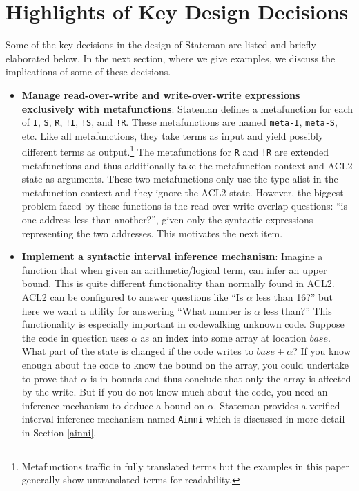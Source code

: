 \documentclass[submission,copyright,creativecommons]{eptcs}
\newcommand{\ptt}[1]{\tt{#1}}
\begin{document}
\section{Highlights of Key Design Decisions}

Some of the key decisions in the design of Stateman are listed and briefly
elaborated below.  In the next section, where we give examples, we discuss
the implications of some of these decisions.

\begin{itemize}

\item {\bf{Manage read-over-write and write-over-write expressions
    exclusively with metafunctions}}: Stateman defines a metafunction for
  each of {\ptt{I}}, {\ptt{S}}, {\ptt{R}}, {\ptt{!I}}, {\ptt{!S}}, and
  {\ptt{!R}}.  These metafunctions are named {\ptt{meta-I}}, {\ptt{meta-S}},
  etc.  Like all metafunctions, they take terms as input and yield possibly
  different terms as output.\footnote{Metafunctions traffic in fully
    translated terms but the examples in this paper generally show
    untranslated terms for readability.}  The metafunctions for {\ptt{R}} and
  {\ptt{!R}} are extended metafunctions and thus additionally take the
  metafunction context and ACL2 state as arguments.  These two metafunctions
  only use the type-alist in the metafunction context and they ignore the
  ACL2 state.  However, the biggest problem faced by these functions is the
  read-over-write overlap questions: ``is one address less than another?'', given
  only the syntactic expressions representing the two addresses.  This
  motivates the next item.

\item {\bf{Implement a syntactic interval inference mechanism}}: Imagine a
  function that when given an arithmetic/logical term, can infer an upper
  bound.  This is quite different functionality than normally found in ACL2.
  ACL2 can be configured to answer questions like ``Is $\alpha$ less than
  16?'' but here we want a utility for answering ``What number is $\alpha$
  less than?''  This functionality is especially important in codewalking
  unknown code.  Suppose the code in question uses $\alpha$ as an index into
  some array at location $base$.  What part of the state is changed if the
  code writes to $base+\alpha$?  If you know enough about the code to know
  the bound on the array, you could undertake to prove that $\alpha$ is in
  bounds and thus conclude that only the array is affected by the write.  But
  if you do not know much about the code, you need an inference mechanism to
  deduce a bound on $\alpha$.  Stateman provides a verified interval
  inference mechanism named {\ptt{Ainni}} which is discussed in more detail
  in Section \ref{ainni}.


\end{itemize}
\end{document}
